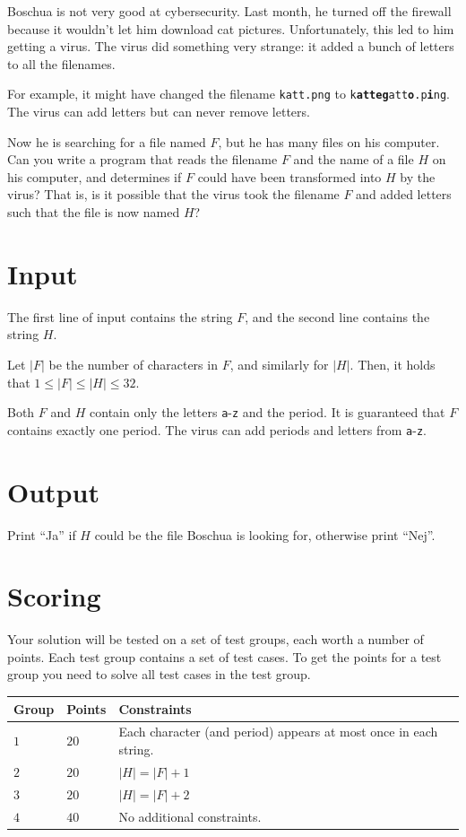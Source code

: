 
Boschua is not very good at cybersecurity. Last month, he turned off the firewall because it wouldn't
let him download cat pictures. Unfortunately, this led to him getting a virus. The virus did something
very strange: it added a bunch of letters to all the filenames.

For example, it might have changed the filename \texttt{katt.png} to
\texttt{k\textbf{atteg}att\textbf{o}.p\textbf{i}ng}.
The virus can add letters but can never remove letters.

Now he is searching for a file named $F$, but he has many files on his computer. Can you write a
program that reads the filename $F$ and the name of a file $H$ on his computer, and determines if
$F$ could have been transformed into $H$ by the virus? That is, is it possible that the virus took
the filename $F$ and added letters such that the file is now named $H$?

\section*{Input}
The first line of input contains the string $F$, and the second line contains the string $H$.

Let $|F|$ be the number of characters in $F$, and similarly for $|H|$.
Then, it holds that $1 \le |F| \le |H| \le 32$.

Both $F$ and $H$ contain only the letters \texttt{a}-\texttt{z} and the period.
It is guaranteed that $F$ contains exactly one period. The virus can add periods and letters from
\texttt{a}-\texttt{z}.

\section*{Output}  
Print ``Ja'' if $H$ could be the file Boschua is looking for, otherwise print ``Nej''.

\section*{Scoring}
Your solution will be tested on a set of test groups, each worth a number of points. Each test group contains
a set of test cases. To get the points for a test group you need to solve all test cases in the test group.

\noindent
\begin{tabular}{| l | l | p{12cm} |}
  \hline
  \textbf{Group} & \textbf{Points} & \textbf{Constraints} \\ \hline
  $1$ & $20$ & Each character (and period) appears at most once in each string. \\ \hline
  $2$ & $20$ & $|H| = |F|+1$ \\ \hline
  $3$ & $20$ & $|H| = |F|+2$ \\ \hline
  $4$ & $40$ & No additional constraints. \\ \hline
\end{tabular}

